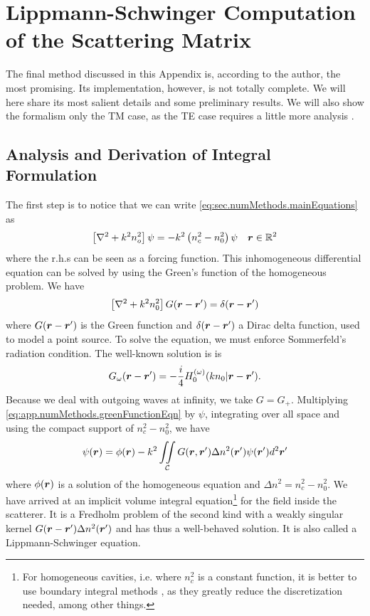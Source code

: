 \section{Lippmann-Schwinger Computation of the Scattering Matrix}\label{sec:app.numTools.lippmannSchwinger}
The final method discussed in this Appendix is, according to the author, the most
promising. Its implementation, however, is not totally complete. We will here share 
its most salient details and some preliminary results. We will also show the formalism
only the TM case, as the TE case requires a little more analysis \cite{MAR2003}. 

\subsection{Analysis and Derivation of Integral Formulation}
The first step is to notice that we can write \eqref{eq:sec.numMethods.mainEquations} as 
	\begin{align}
		\left[\nabla^2+k^2n_o^2\right]\psi &= -k^2\left(n_c^2-n_0^2\right)\psi & \boldsymbol{r}\in\mathbb{R}^2
	\end{align}
where the r.h.s can be seen as a forcing function. This inhomogeneous differential
equation can be solved by using the Green's function of the homogeneous
problem. We have
	\begin{equation}
		\label{eq:app.numMethods.greenFunctionEqn}
		\left[\nabla^2+k^2n_0^2\right]G(\boldsymbol{r}-\boldsymbol{r}')=\delta(\boldsymbol{r}-\boldsymbol{r}')
	\end{equation}
where $G(\boldsymbol{r}-\boldsymbol{r}')$ is the Green function and
$\delta(\boldsymbol{r}-\boldsymbol{r}')$ a Dirac delta function, used to model
a point source. To solve the equation, we must enforce Sommerfeld's
radiation condition. The well-known solution is \cite{GAG2012} is
	\begin{equation}
		G_\omega(\boldsymbol{r}-\boldsymbol{r}') = -\frac{i}{4}H_0^{(\omega)}(kn_0|\boldsymbol{r}-\boldsymbol{r}').
	\end{equation}
Because we deal with outgoing waves at infinity, we take $G=G_+$. 
Multiplying \eqref{eq:app.numMethods.greenFunctionEqn} by $\psi$, 
integrating over all space and using the compact support of 
$n_c^2-n_0^2$, we have
	\begin{equation}
		\psi(\boldsymbol{r}) = \phi(\boldsymbol{r}) - k^2\mathop{\iint}_\mathcal{C} G(\boldsymbol{r},\boldsymbol{r}')\Delta n^2(\boldsymbol{r}')\psi(\boldsymbol{r}')d^2\boldsymbol{r}'
	\end{equation}
where $\phi(\boldsymbol{r})$ is a solution of the homogeneous equation and $\Delta n^2=n_c^2-n_0^2$. 
We have arrived at an implicit volume integral equation\footnote{For homogeneous cavities, i.e. where
$n_c^2$ is a constant function, it is better to use boundary integral methods \cite{WIE2003,BOR2004}, as they greatly reduce
the discretization needed, among other things.} for the field inside the scatterer. 
It is a Fredholm problem of the second kind with a weakly singular kernel $G(\boldsymbol{r}-\boldsymbol{r}')\Delta n^2(\boldsymbol{r}')$ 
\cite{DEL1985} and has thus a well-behaved solution. It is also called a Lippmann-Schwinger equation. 

